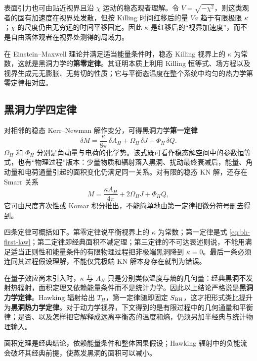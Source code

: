 表面引力也可由贴近视界且沿 $\chi$ 运动的稳态观者理解。令 $V=\sqrt{-\chi^2}$，则这类观者的固有加速度在视界处发散，但按 Killing 时间红移后的量 $Va$ 趋于有限极限 $\kappa$；$\chi$ 的尺度仍由无穷远的时间平移固定。因此 $\kappa$ 是红移后的“视界加速度”，而不是自由落体观者在视界处测得的局域力。

在 Einstein--Maxwell 理论并满足适当能量条件时，稳态 Killing 视界上的 $\kappa$ 为常数，这就是黑洞力学的\textbf{第零定律}。其证明本质上利用 Killing 恒等式、场方程以及视界生成元无膨胀、无剪切的性质；它与平衡态温度在整个系统中均匀的热力学第零定律相对应。





\subsection{黑洞力学四定律}

对相邻的稳态 Kerr--Newman 解作变分，可得黑洞力学\textbf{第一定律}
\begin{equation}\label{eq:bh-first-law}
    \delta M=\frac{\kappa}{8\pi}\,\delta A_H
       +\Omega_H\,\delta J+\Phi_H\,\delta Q .
\end{equation}
$\Omega_H$ 和 $\Phi_H$ 分别是角动量与电荷的化学势。该式既可看作稳态解空间中的参数恒等式，也有“物理过程”版本：少量物质和辐射落入黑洞、扰动最终衰减后，能量、角动量和电荷通量引起的面积变化仍满足同一关系。对有限的稳态 KN 解，还存在 Smarr 关系
\begin{equation}
    M=\frac{\kappa A_H}{4\pi}+2\Omega_HJ+\Phi_HQ,
\end{equation}
它可由尺度齐次性或 Komar 积分推出，不能简单地由第一定律把微分符号删去得到。

四条定律可概括如下。第零定律说平衡视界上的 $\kappa$ 为常数；第一定律是式 \eqref{eq:bh-first-law}；第二定律即经典面积不减定理；第三定律的不可达表述则说，不能用满足适当正则性和能量条件的有限物理过程把非极端黑洞降到 $\kappa=0$。最后一条必须连同其过程假设理解，不能仅凭极端 KN 解本身存在就判为错误。

在量子效应尚未引入时，$\kappa$ 与 $A_H$ 只是分别类似温度与熵的几何量：经典黑洞不发射热辐射，面积定理又依赖能量条件而不是统计力学。因此以上结论严格说是\textbf{黑洞力学定律}。Hawking 辐射给出 $T_H$，第一定律随即固定 $S_{\rm BH}$，这才把形式类比提升为\textbf{黑洞热力学定律}。对于动力学视界，下文得到的是有限过程中的几何通量和平衡律；是否、以及怎样把它解释成远离平衡态的温度和熵，仍须另加半经典与统计物理输入。

面积定理是经典结论，依赖能量条件和整体因果假设；Hawking 辐射中的负能流会破坏其经典前提，使蒸发黑洞的面积可以减小。

